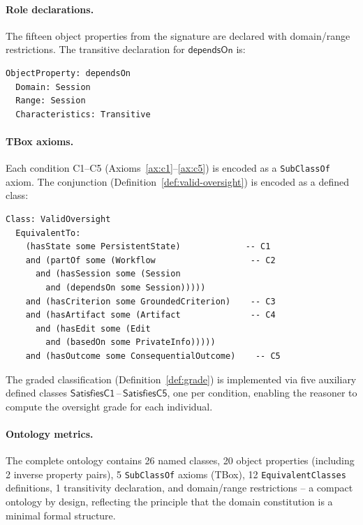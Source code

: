 \documentclass[11pt]{article}
\begin{document}
\paragraph{Role declarations.}
The fifteen object properties from the signature are declared with domain/range restrictions.
The transitive declaration for $\mathsf{dependsOn}$ is:

\begin{small}
\begin{verbatim}
ObjectProperty: dependsOn
  Domain: Session
  Range: Session
  Characteristics: Transitive
\end{verbatim}
\end{small}

\paragraph{TBox axioms.}
Each condition C1--C5 (Axioms~\ref{ax:c1}--\ref{ax:c5}) is encoded as a \texttt{SubClassOf} axiom.
The conjunction (Definition~\ref{def:valid-oversight}) is encoded as a defined class:

\begin{small}
\begin{verbatim}
Class: ValidOversight
  EquivalentTo:
    (hasState some PersistentState)             -- C1
    and (partOf some (Workflow                   -- C2
      and (hasSession some (Session
        and (dependsOn some Session)))))
    and (hasCriterion some GroundedCriterion)    -- C3
    and (hasArtifact some (Artifact              -- C4
      and (hasEdit some (Edit
        and (basedOn some PrivateInfo)))))
    and (hasOutcome some ConsequentialOutcome)    -- C5
\end{verbatim}
\end{small}

The graded classification (Definition~\ref{def:grade}) is implemented via five auxiliary defined classes $\mathsf{SatisfiesC1}$\,--\,$\mathsf{SatisfiesC5}$, one per condition, enabling the reasoner to compute the oversight grade for each individual.

\paragraph{Ontology metrics.}
The complete ontology contains 26 named classes, 20 object properties (including 2 inverse property pairs), 5 \texttt{SubClassOf} axioms (TBox), 12 \texttt{EquivalentClasses} definitions, 1 transitivity declaration, and domain/range restrictions -- a compact ontology by design, reflecting the principle that the domain constitution is a minimal formal structure.
\end{document}
